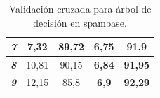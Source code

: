 \begin{table}[ht]
\begin{tabular}{@{}r|c|c|c|c|@{}}
\multicolumn{1}{|r|}{\textit{\textbf{7}}}           & \textbf{7,32}                                     & 89,72                                                 & 6,75                                              & \textbf{91,9}                                         \\ \midrule
\multicolumn{1}{|r|}{\textit{\textbf{8}}}           & 10,81                                             & 90,15                                                 & \textbf{6,84}                                     & \textbf{91,95}                                        \\ \midrule
\multicolumn{1}{|r|}{\textit{\textbf{9}}}           & 12,15                                             & 85,8                                                  & \textbf{6,9}                                      & \textbf{92,29}                                        \\ \bottomrule
\end{tabular}
\caption{Validación cruzada para árbol de decisión en spambase.}
\label{tab:spamtree}
\end{table}


